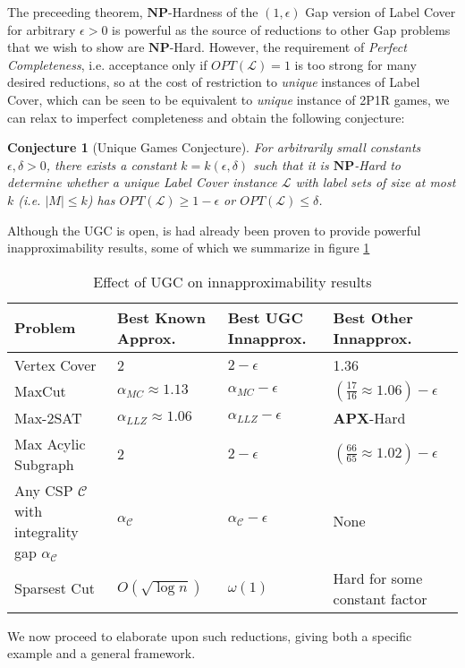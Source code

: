 \documentclass{article}
\newtheorem{conjecture}{Conjecture}
\newcommand{\NP}{\ensuremath{\mathbf{NP}}}
\newcommand{\APX}{\ensuremath{\mathbf{APX}}}
\newcommand{\C}{\ensuremath{\mathcal{C}}}
\renewcommand{\a}{\alpha}
\renewcommand{\d}{\delta}
\newcommand{\e}{\epsilon}
\renewcommand{\L}{\ensuremath{\mathcal{L}}}
\newcommand{\OPT}{\ensuremath{\mathit{OPT}}}
\newcommand{\1}{\mathbbm{1}}
\begin{document}
The preceeding theorem, $\NP$-Hardness of the $(1,\e)$ Gap version of Label Cover for arbitrary $\e > 0$ is powerful as the source of reductions to other Gap problems that we wish to show are $\NP$-Hard. However, the requirement of \textit{Perfect Completeness}, i.e. acceptance only if $\OPT(\L) = 1$ is too strong for many desired reductions, so at the cost of restriction to \textit{unique} instances of Label Cover, which can be seen to be equivalent to \textit{unique} instance of 2P1R games, we can relax to imperfect completeness and obtain the following conjecture:
\begin{conjecture}[Unique Games Conjecture]
  For arbitrarily small constants $\e, \d > 0$, there exists a constant $k = k(\e, \d)$ such that it is \NP-Hard to determine whether a unique Label Cover instance $\L$ with label sets of size at most $k$ (i.e. $|M| \le k$) has $\OPT(\L) \ge 1 - \e$ or $\OPT(\L) \le \d$.
\end{conjecture}

Although the UGC is open, is had already been proven to provide powerful inapproximability results, some of which we summarize in figure \ref{ugctable}

\begin{table}[]
  \centering
  \begin{tabular}{|p{2.5cm}|p{2.5cm}|p{2cm}|p{2.5cm}|}
    \hline 
    \textbf{Problem} & \textbf{Best Known Approx.} & \textbf{Best UGC Innapprox.} & \textbf{Best Other Innapprox.} \\\hline
    Vertex Cover & 2 & $2 - \e$ & 1.36 \\\hline
    MaxCut & $\a_{MC} \approx 1.13$ & $\a_{MC} - \e$ & $(\frac{17}{16} \approx 1.06) - \e$ \\\hline
    Max-2SAT &$\a_{LLZ} \approx 1.06$ & $\a_{LLZ} - \e$ & \APX-Hard \\\hline
    Max Acylic Subgraph & 2 & $ 2 - \e$ & $(\frac{66}{65} \approx 1.02)- \e$ \\\hline
    Any CSP $\mathcal{C}$ with integrality gap $\a_\C$ & $\a_\C$ & $\a_\C - \e$ & None \\\hline
    Sparsest Cut & $O(\sqrt{\log{n}})$ & $\omega(1)$ & Hard for some constant factor\\\hline
  \end{tabular}
  \caption{Effect of UGC on innapproximability results}
  \label{ugctable}
\end{table}

We now proceed to elaborate upon such reductions, giving both a specific example and a general framework.
\end{document}
